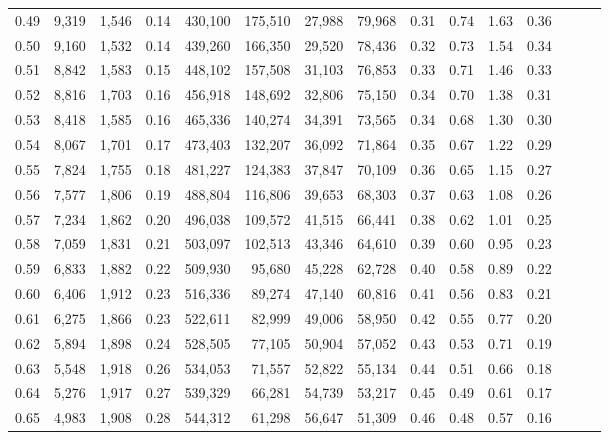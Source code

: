 \begin{tabular}{rrrrrrrrrrrrrrr}
0.49 &   9,319 &  1,546 &  0.14 &  430,100 &  175,510 &   27,988 &   79,968 &  0.31 &  0.74 &  1.63 &      0.36 \\
0.50 &   9,160 &  1,532 &  0.14 &  439,260 &  166,350 &   29,520 &   78,436 &  0.32 &  0.73 &  1.54 &      0.34 \\
0.51 &   8,842 &  1,583 &  0.15 &  448,102 &  157,508 &   31,103 &   76,853 &  0.33 &  0.71 &  1.46 &      0.33 \\
0.52 &   8,816 &  1,703 &  0.16 &  456,918 &  148,692 &   32,806 &   75,150 &  0.34 &  0.70 &  1.38 &      0.31 \\
0.53 &   8,418 &  1,585 &  0.16 &  465,336 &  140,274 &   34,391 &   73,565 &  0.34 &  0.68 &  1.30 &      0.30 \\
0.54 &   8,067 &  1,701 &  0.17 &  473,403 &  132,207 &   36,092 &   71,864 &  0.35 &  0.67 &  1.22 &      0.29 \\
0.55 &   7,824 &  1,755 &  0.18 &  481,227 &  124,383 &   37,847 &   70,109 &  0.36 &  0.65 &  1.15 &      0.27 \\
0.56 &   7,577 &  1,806 &  0.19 &  488,804 &  116,806 &   39,653 &   68,303 &  0.37 &  0.63 &  1.08 &      0.26 \\
0.57 &   7,234 &  1,862 &  0.20 &  496,038 &  109,572 &   41,515 &   66,441 &  0.38 &  0.62 &  1.01 &      0.25 \\
0.58 &   7,059 &  1,831 &  0.21 &  503,097 &  102,513 &   43,346 &   64,610 &  0.39 &  0.60 &  0.95 &      0.23 \\
0.59 &   6,833 &  1,882 &  0.22 &  509,930 &   95,680 &   45,228 &   62,728 &  0.40 &  0.58 &  0.89 &      0.22 \\
0.60 &   6,406 &  1,912 &  0.23 &  516,336 &   89,274 &   47,140 &   60,816 &  0.41 &  0.56 &  0.83 &      0.21 \\
0.61 &   6,275 &  1,866 &  0.23 &  522,611 &   82,999 &   49,006 &   58,950 &  0.42 &  0.55 &  0.77 &      0.20 \\
0.62 &   5,894 &  1,898 &  0.24 &  528,505 &   77,105 &   50,904 &   57,052 &  0.43 &  0.53 &  0.71 &      0.19 \\
0.63 &   5,548 &  1,918 &  0.26 &  534,053 &   71,557 &   52,822 &   55,134 &  0.44 &  0.51 &  0.66 &      0.18 \\
0.64 &   5,276 &  1,917 &  0.27 &  539,329 &   66,281 &   54,739 &   53,217 &  0.45 &  0.49 &  0.61 &      0.17 \\
0.65 &   4,983 &  1,908 &  0.28 &  544,312 &   61,298 &   56,647 &   51,309 &  0.46 &  0.48 &  0.57 &      0.16 \\

\end{tabular}
